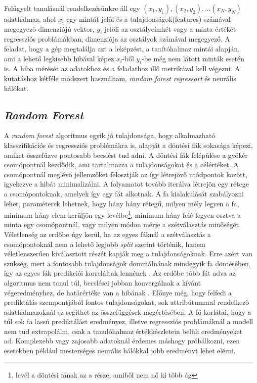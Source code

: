 \documentclass[12pt,letterpaper,twoside,openright]{book}
\begin{document}
\newline \indent
Felügyelt tanulásnál rendelkezésünkre áll egy $(x_1, y_1), (x_2, y_2),...(x_N, y_N)$ adathalmaz, ahol $x_i$ egy mintát jelöl és a tulajdonságok(features) számával megegyező dimenziójú vektor, $y_i$ jelöli az osztálycímkét vagy a minta értékét regressziós problámákban, dimenziója az osztályok számával megegyező. A feladat, hogy a gép megtalálja azt a leképzést, a tanítóhalmaz mintái alapján, ami a lehető legkisebb hibával képez $x_i$-ből $y_i$-be még nem látott minták esetén is. A hiba mérését az adatokhoz és a feladathoz illő metrikával kell végezni. A kutatáshoz kétféle módszert használtam, \textit{random forest regressort} és neurális hálókat. 
\subsection{\textit{Random Forest}}
A \textit{random forest} algoritmus egyik jó tulajdonsága, hogy alkalmazható klasszifikációs és regressziós problémákra is, alapját a döntési fák sokasága képezi, amiket összefűzve pontosabb becslést tud adni. A döntési fák felépülése a gyökér csomópontnál kezdődik, ami tartalmazza a tulajdonságokat és a célértéket. A csomópontnál meglévő jellemzőket felosztják az így létrejövő utódpontok között, igyekezve a hibát minimalizálni. A folyamatot tovább iterálva létrejön egy rétege a csomópontoknak, amelyek így egy fát alkotnak. A fa kialakulását szabályozni lehet, paraméterek lehetnek, hogy hány hány rétegű, milyen mély legyen a fa, minimum hány elem kerüljön egy levélbe\footnote{levél a döntési fának az a része, amiből nem nő ki több ág}, minimum hány felé legyen osztva a minta egy csomópontnál, vagy milyen módon mérje a szétválasztás minőségét. Véletlenség az erdőbe úgy kerül, ha az egyes fáknál a szétválasztás a csomópontoknál nem a lehető legjobb \textit{split} szerint történik, hanem véletlenszerűen kiválasztott részét kapják meg a  tulajdonságoknak. Erre azért van szükség, mert a fontosabb tulajdonságok dominálnának mindegyik fa döntésében, így az egyes fák predikciói korreláltak lennének \cite{randomF}. Az erdőbe több fát adva az algoritmus nem tanul túl, becslései jobban konvergálnak a kívánt végeredményhez, de határértéke van a hibának \cite{rf2}. Előnye még, hogy felfedi a prediktálás szempontjából fontos tulajdonságokat, 
sok attribútummal rendelkező adathalmazoknál ez segíthet az összefüggések megértésében. A fő korlátai, hogy a túl sok fa lassú prediktálást eredményez, illetve regressziós problámáknál a modell nem tud extrapolálni, csak a tanulóhalmaz értékkészletein belüli eredményeket ad. Komplexebb vagy zajosabb adatoknál érdemes máshogy próbálkozni, ezen esetekben például mesterséges neurális hálókkal jobb eredményt lehet elérni.
\end{document}
